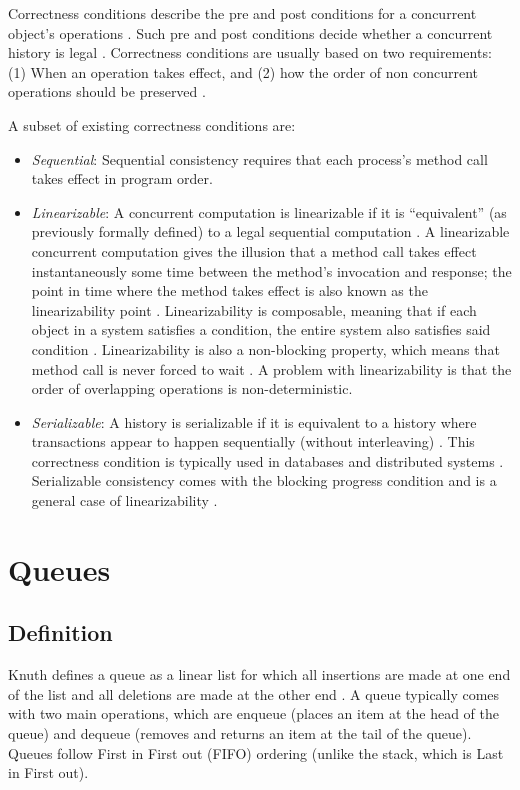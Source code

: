 Correctness conditions describe the pre and post conditions for a concurrent object's operations \cite{herlihy2020art}. Such pre and post conditions decide whether a concurrent history is legal \cite{herlihy1990linearizability}. Correctness conditions are usually based on two requirements: (1) When an operation takes effect, and (2) how the order of non concurrent operations should be preserved \cite{herlihy1990linearizability}.

A subset of existing correctness conditions are:

\begin{itemize}
\item \emph{Sequential}: Sequential consistency requires that each process's method call takes effect in program order.
\item \emph{Linearizable}: A concurrent computation is linearizable if it is ``equivalent'' (as previously formally defined) to a legal sequential computation \cite{herlihy1990linearizability}. A linearizable concurrent computation gives the illusion that a method call takes effect instantaneously some time between the method's invocation and response; the point in time where the method takes effect is also known as the linearizability point \cite{herlihy2020art,herlihy1990linearizability}. Linearizability is composable, meaning that if each object in a system satisfies a condition, the entire system also satisfies said condition \cite[Chapter~3.3.1]{herlihy2020art}. Linearizability is also a non-blocking property, which means that method call is never forced to wait \cite{herlihy1990linearizability}. A problem with linearizability is that the order of overlapping operations is non-deterministic.
\item \emph{Serializable}: A history is serializable if it is equivalent to a history where transactions appear to happen sequentially (without interleaving) \cite[Section~3.3]{herlihy1990linearizability}. This correctness condition is typically used in databases and distributed systems \cite{guerraoui2019consensus}. Serializable consistency comes with the blocking progress condition and is a general case of linearizability \cite{herlihy1990linearizability}.
\end{itemize}

\section{Queues}
\subsection{Definition}
Knuth defines a queue as a linear list for which all insertions are made at one end of the list and all deletions are made at the other end \cite{knuth1968art}. A queue typically comes with two main operations, which are enqueue (places an item at the head of the queue) and dequeue (removes and returns an item at the tail of the queue). Queues follow First in First out (FIFO) ordering (unlike the stack, which is Last in First out).
